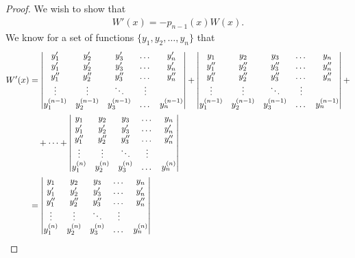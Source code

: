 \documentclass[12pt]{article}
\theoremstyle{definition}
\begin{document}
\begin{proof}
  We wish to show that
  \begin{align}\label{identity}
    W'(x) = -p_{n-1}(x)W(x).
  \end{align}
  We know for a set of functions $\{y_1, y_2, \dots, y_n\}$ that
  \begin{align}\label{det}
    W'(x) &=
    \begin{vmatrix}
      y_1' & y_2' & y_3' & \dots & y_n' \\
      y_1' & y_2' & y_3' & \dots & y_n' \\
      y_1'' & y_2'' & y_3''& \dots & y_n'' \\
      \vdots & \vdots & \ddots & \vdots \\
      y_1^{(n-1)} & y_2^{(n-1)} & y_3^{(n-1)} & \dots & y_n^{(n-1)} \\
    \end{vmatrix}
    +
    \begin{vmatrix}
      y_1 & y_2 & y_3 & \dots & y_n \\
      y_1'' & y_2'' & y_3'' & \dots & y_n'' \\
      y_1'' & y_2'' & y_3''& \dots & y_n'' \\
      \vdots & \vdots & \ddots & \vdots \\
      y_1^{(n-1)} & y_2^{(n-1)} & y_3^{(n-1)} & \dots & y_n^{(n-1)} \\
    \end{vmatrix}
    + \notag \\
    &\quad +\dots +
    \begin{vmatrix}
      y_1 & y_2 & y_3 & \dots & y_n \\
      y_1' & y_2' & y_3' & \dots & y_n' \\
      y_1'' & y_2'' & y_3''& \dots & y_n'' \\
      \vdots & \vdots & \ddots & \vdots \\
      y_1^{(n)} & y_2^{(n)} & y_3^{(n)} & \dots & y_n^{(n)} \\
    \end{vmatrix} \notag \\
    &=
    \begin{vmatrix}
      y_1 & y_2 & y_3 & \dots & y_n \\
      y_1' & y_2' & y_3' & \dots & y_n' \\
      y_1'' & y_2'' & y_3''& \dots & y_n'' \\
      \vdots & \vdots & \ddots & \vdots \\
      y_1^{(n)} & y_2^{(n)} & y_3^{(n)} & \dots & y_n^{(n)} \\

\end{vmatrix}
\end{align}
\end{proof}
\end{document}
